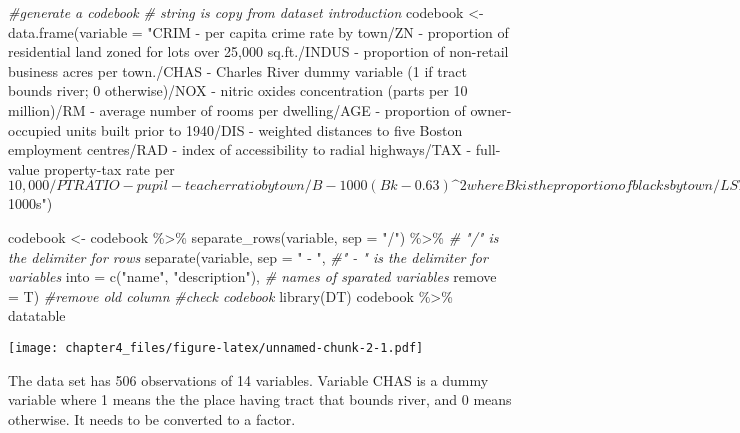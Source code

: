 \documentclass[
]{article}
\newenvironment{Shaded}{\begin{snugshade}}{\end{snugshade}}
\newcommand{\AttributeTok}[1]{\textcolor[rgb]{0.77,0.63,0.00}{#1}}
\newcommand{\CommentTok}[1]{\textcolor[rgb]{0.56,0.35,0.01}{\textit{#1}}}
\newcommand{\FunctionTok}[1]{\textcolor[rgb]{0.00,0.00,0.00}{#1}}
\newcommand{\NormalTok}[1]{#1}
\newcommand{\OtherTok}[1]{\textcolor[rgb]{0.56,0.35,0.01}{#1}}
\newcommand{\SpecialCharTok}[1]{\textcolor[rgb]{0.00,0.00,0.00}{#1}}
\newcommand{\StringTok}[1]{\textcolor[rgb]{0.31,0.60,0.02}{#1}}
\begin{document}
\begin{Shaded}
\begin{Highlighting}[]
\CommentTok{\#generate a codebook}
\CommentTok{\# string is copy from dataset introduction}
\NormalTok{codebook }\OtherTok{\textless{}{-}} \FunctionTok{data.frame}\NormalTok{(}\AttributeTok{variable =} \StringTok{"CRIM {-} per capita crime rate by town/ZN {-} proportion of residential land zoned for lots over 25,000 sq.ft./INDUS {-} proportion of non{-}retail business acres per town./CHAS {-} Charles River dummy variable (1 if tract bounds river; 0 otherwise)/NOX {-} nitric oxides concentration (parts per 10 million)/RM {-} average number of rooms per dwelling/AGE {-} proportion of owner{-}occupied units built prior to 1940/DIS {-} weighted distances to five Boston employment centres/RAD {-} index of accessibility to radial highways/TAX {-} full{-}value property{-}tax rate per $10,000/PTRATIO {-} pupil{-}teacher ratio by town/B {-} 1000(Bk{-}0.63)\^{}2 where Bk is the proportion of blacks by town/LSTAT {-} \% lower status of the population/MEDV {-} Median value of owner{-}occupied homes in $1000\textquotesingle{}s"}\NormalTok{) }

\NormalTok{codebook }\OtherTok{\textless{}{-}}\NormalTok{ codebook }\SpecialCharTok{\%\textgreater{}\%} 
  \FunctionTok{separate\_rows}\NormalTok{(variable, }\AttributeTok{sep =} \StringTok{"/"}\NormalTok{) }\SpecialCharTok{\%\textgreater{}\%}  \CommentTok{\# "/" is the delimiter for rows}
  \FunctionTok{separate}\NormalTok{(variable, }\AttributeTok{sep =} \StringTok{" {-} "}\NormalTok{,      }\CommentTok{\#" {-} " is the delimiter for variables}
           \AttributeTok{into =} \FunctionTok{c}\NormalTok{(}\StringTok{"name"}\NormalTok{, }\StringTok{"description"}\NormalTok{),  }\CommentTok{\# names of sparated variables}
           \AttributeTok{remove =}\NormalTok{ T)  }\CommentTok{\#remove old column}
\CommentTok{\#check codebook}
\FunctionTok{library}\NormalTok{(DT)}
\NormalTok{codebook }\SpecialCharTok{\%\textgreater{}\%}\NormalTok{ datatable }
\end{Highlighting}
\end{Shaded}

\texttt{[image: chapter4\_files/figure-latex/unnamed-chunk-2-1.pdf]}

The data set has 506 observations of 14 variables. Variable CHAS is a
dummy variable where 1 means the the place having tract that bounds
river, and 0 means otherwise. It needs to be converted to a factor.
\end{document}
